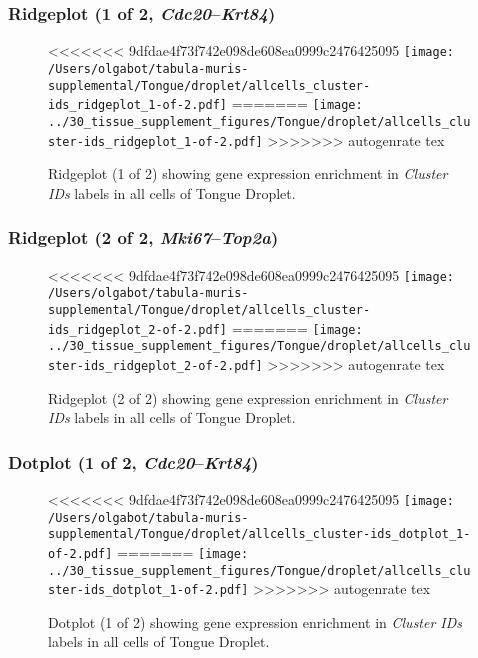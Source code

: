 \subsubsection{Ridgeplot (1 of 2, \emph{Cdc20}--\emph{Krt84})}
\begin{figure}[h]
\centering
<<<<<<< 9dfdae4f73f742e098de608ea0999c2476425095
\texttt{[image: /Users/olgabot/tabula-muris-supplemental/Tongue/droplet/allcells\_cluster-ids\_ridgeplot\_1-of-2.pdf]}
=======
\texttt{[image: ../30\_tissue\_supplement\_figures/Tongue/droplet/allcells\_cluster-ids\_ridgeplot\_1-of-2.pdf]}
>>>>>>> autogenrate tex

\caption{ Ridgeplot (1 of 2)  showing gene expression enrichment in \emph{Cluster IDs} labels in all cells of Tongue Droplet. }
\end{figure}


\clearpage

\subsubsection{Ridgeplot (2 of 2, \emph{Mki67}--\emph{Top2a})}
\begin{figure}[h]
\centering
<<<<<<< 9dfdae4f73f742e098de608ea0999c2476425095
\texttt{[image: /Users/olgabot/tabula-muris-supplemental/Tongue/droplet/allcells\_cluster-ids\_ridgeplot\_2-of-2.pdf]}
=======
\texttt{[image: ../30\_tissue\_supplement\_figures/Tongue/droplet/allcells\_cluster-ids\_ridgeplot\_2-of-2.pdf]}
>>>>>>> autogenrate tex

\caption{ Ridgeplot (2 of 2)  showing gene expression enrichment in \emph{Cluster IDs} labels in all cells of Tongue Droplet. }
\end{figure}


\clearpage

\subsubsection{Dotplot (1 of 2, \emph{Cdc20}--\emph{Krt84})}
\begin{figure}[h]
\centering
<<<<<<< 9dfdae4f73f742e098de608ea0999c2476425095
\texttt{[image: /Users/olgabot/tabula-muris-supplemental/Tongue/droplet/allcells\_cluster-ids\_dotplot\_1-of-2.pdf]}
=======
\texttt{[image: ../30\_tissue\_supplement\_figures/Tongue/droplet/allcells\_cluster-ids\_dotplot\_1-of-2.pdf]}
>>>>>>> autogenrate tex

\caption{ Dotplot (1 of 2)  showing gene expression enrichment in \emph{Cluster IDs} labels in all cells of Tongue Droplet. }
\end{figure}


